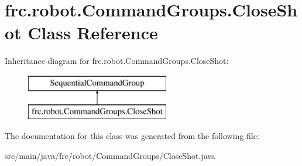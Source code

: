 \hypertarget{classfrc_1_1robot_1_1_command_groups_1_1_close_shot}{}\section{frc.\+robot.\+Command\+Groups.\+Close\+Shot Class Reference}
\label{classfrc_1_1robot_1_1_command_groups_1_1_close_shot}
Inheritance diagram for frc.\+robot.\+Command\+Groups.\+Close\+Shot\+:\begin{figure}[H]
\begin{center}
\leavevmode
\includegraphics[height=2.000000cm]{classfrc_1_1robot_1_1_command_groups_1_1_close_shot}
\end{center}
\end{figure}


The documentation for this class was generated from the following file\+:\begin{DoxyCompactItemize}
\item 
src/main/java/frc/robot/\+Command\+Groups/Close\+Shot.\+java\end{DoxyCompactItemize}
